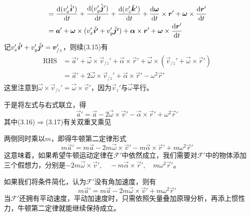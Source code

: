 \begin{prove}
\begin{align}
		&=\dfrac{\mathrm{d}(v_x'\hat{\boldsymbol{i}}')}{\mathrm{d} t}+\dfrac{\mathrm{d}(v_y'\hat{\boldsymbol{j}}')}{\mathrm{d} t}+\dfrac{\mathrm{d}(v_z'\hat{\boldsymbol{k}}')}{\mathrm{d} t}+\dfrac{\mathrm{d}\boldsymbol{\omega}}{\mathrm{d} t}\times\boldsymbol{r}'+\boldsymbol{\omega}\times\dfrac{\mathrm{d}\boldsymbol{r}'}{\mathrm{d} t}\\
		&=\boldsymbol{a}'+\boldsymbol{\omega}\times(v_x'\hat{\boldsymbol{i'}}+v_y'\hat{\boldsymbol{j'}})+\boldsymbol{\alpha}\times\boldsymbol{r}'+\boldsymbol{\omega}\times\dfrac{\mathrm{d}\boldsymbol{r}'}{\mathrm{d} t}
	\end{align}
	记$v_x'\hat{\boldsymbol{i'}}+v_y'\hat{\boldsymbol{j'}}=\boldsymbol{v}_{/z}'$，则续(3.15)有
	\begin{align}
		\mathrm{RHS}&=\vec{a}'+\vec{\omega}\times\vec{v}_{/z}'+\vec{\alpha}\times\vec{r}'+\vec{\omega}\times(\vec{v}_{/z}'+\vec{\omega}\times\vec{r}')\\
		&=\vec{a}'+2\vec{\omega}\times\vec{v}_{/z}'+\vec{\alpha}\times\vec{r}'-\omega^2\vec{r}'
	\end{align}
	这里注意到$\vec{\omega}\times\vec{v}_{/z}'=\vec{\omega}\times\vec{v}'$，因为$\vec{v}_z'$与$\vec{\omega}$平行。
	
	于是将左式与右式联立，得
	\[\vec{a}'=\vec{a}-2\vec{\omega}\times\vec{v}'-\vec{\alpha}\times\vec{r}'+\omega^2\vec{r}'\]
	其中(3.16)$\Rightarrow$(3.17)有关双重叉乘见
	
	两侧同时乘以$m$，即得牛顿第二定律形式
	\[m\vec{a}'=m\vec{a}-2m\vec{\omega}\times\vec{v}'-m\vec{\alpha}\times\vec{r}'+m\omega^2\vec{r}'\]
	这意味着，如果希望牛顿运动定律在$\mathcal{F}'$中依然成立，我们需要对$\mathcal{F}'$中的物体添加三个假想力，分别是$-2m\vec{\omega}\times\vec{v}',\quad-m\vec{\alpha}\times\vec{r}',\quad m\omega^2\vec{r}'$。
	
	如果我们将条件简化，认为$\mathcal{F}'$没有角加速度，则有
	\[m\vec{a}'=m\vec{a}-2m\vec{\omega}\times\vec{v}'+m\omega^2\vec{r}'\]
	当$\mathcal{F}'$还拥有平动速度，平动加速度时，只需依照矢量叠加原理分析，再添上惯性力，牛顿第二定律就能继续保持成立。
\end{prove}